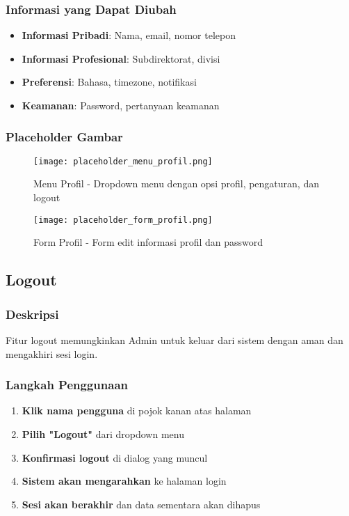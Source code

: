 \documentclass[12pt,a4paper]{article}
\begin{document}
\subsubsection{Informasi yang Dapat Diubah}
\begin{itemize}
\item \textbf{Informasi Pribadi}: Nama, email, nomor telepon
\item \textbf{Informasi Profesional}: Subdirektorat, divisi
\item \textbf{Preferensi}: Bahasa, timezone, notifikasi
\item \textbf{Keamanan}: Password, pertanyaan keamanan
\end{itemize}

\subsubsection{Placeholder Gambar}
\begin{figure}[H]
\centering
\texttt{[image: placeholder\_menu\_profil.png]}
\caption{Menu Profil - Dropdown menu dengan opsi profil, pengaturan, dan logout}
\label{fig:menu_profil}
\end{figure}

\begin{figure}[H]
\centering
\texttt{[image: placeholder\_form\_profil.png]}
\caption{Form Profil - Form edit informasi profil dan password}
\label{fig:form_profil}
\end{figure}

\subsection{Logout}

\subsubsection{Deskripsi}
Fitur logout memungkinkan Admin untuk keluar dari sistem dengan aman dan mengakhiri sesi login.

\subsubsection{Langkah Penggunaan}
\begin{enumerate}
\item \textbf{Klik nama pengguna} di pojok kanan atas halaman
\item \textbf{Pilih "Logout"} dari dropdown menu
\item \textbf{Konfirmasi logout} di dialog yang muncul
\item \textbf{Sistem akan mengarahkan} ke halaman login
\item \textbf{Sesi akan berakhir} dan data sementara akan dihapus
\end{enumerate}
\end{document}

